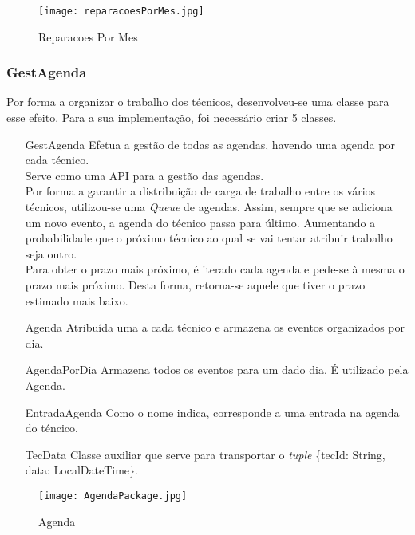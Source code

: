 \documentclass[../../relatorio.tex]{subfiles}
\begin{document}
\begin{figure} [!ht]
    \centering
    \texttt{[image: reparacoesPorMes.jpg]}
    \caption{Reparacoes Por Mes}\label{img:reparacoes_por_mes}
\end{figure}

\subsubsection*{GestAgenda} \label{class:gest_agenda}
Por forma a organizar o trabalho dos técnicos, desenvolveu-se uma classe para esse efeito.
Para a sua implementação, foi necessário criar 5 classes.

\begin{itemize}
    \item[GestAgenda]{
          Efetua a gestão de todas as agendas, havendo uma agenda por cada técnico.\\
          Serve como uma API para a gestão das agendas.\\
          Por forma a garantir a distribuição de carga de trabalho entre os vários técnicos,
          utilizou-se uma \textit{Queue} de agendas.
          Assim, sempre que se adiciona um novo evento, a agenda do técnico passa para último.
          Aumentando a probabilidade que o próximo técnico ao qual se vai tentar atribuir trabalho seja outro.\\
          Para obter o prazo mais próximo, é iterado cada agenda e pede-se à mesma o prazo mais próximo.
          Desta forma, retorna-se aquele que tiver o prazo estimado mais baixo.
          }
    \item[Agenda] {
          Atribuída uma a cada técnico e armazena os eventos organizados por dia.
          }
    \item[AgendaPorDia]{
          Armazena todos os eventos para um dado dia. É utilizado pela Agenda.
          }
    \item[EntradaAgenda] {
          Como o nome indica, corresponde a uma entrada na agenda do téncico.
          }
    \item[TecData] {
          Classe auxiliar que serve para transportar o \textit{tuple} \{tecId: String, data: LocalDateTime\}.
          }
\end{itemize}

\begin{landscape}
    \begin{figure} [!ht]
        \centering
        \texttt{[image: AgendaPackage.jpg]}
        \caption{Agenda}\label{img:agenda}
    \end{figure}
\end{landscape}
\end{document}
